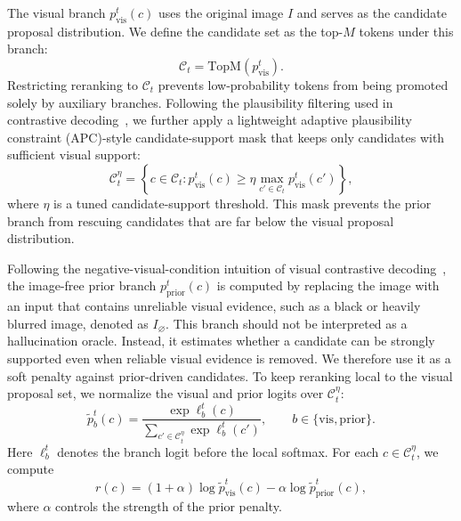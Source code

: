 \documentclass[11pt]{article}
\begin{document}
  The visual branch $p_{\mathrm{vis}}^t(c)$ uses the original image $I$ and serves as the candidate proposal distribution. We define the candidate set as the top-$M$ tokens under this branch:
  \begin{equation}
  \mathcal{C}_t = \mathrm{TopM}\left(p_{\mathrm{vis}}^t\right).
  \end{equation}
  Restricting reranking to $\mathcal{C}_t$ prevents low-probability tokens from being promoted solely by auxiliary branches.
  Following the plausibility filtering used in contrastive decoding~\citep{Leng_2024_CVPR}, we further apply a lightweight adaptive plausibility constraint (APC)-style candidate-support mask that keeps only candidates with sufficient visual support:
  \begin{equation}
  \mathcal{C}_t^{\eta} =
  \left\{
  c \in \mathcal{C}_t :
  p_{\mathrm{vis}}^t(c) \ge
  \eta \max_{c' \in \mathcal{C}_t} p_{\mathrm{vis}}^t(c')
  \right\},
  \end{equation}
  where $\eta$ is a tuned candidate-support threshold.
  This mask prevents the prior branch from rescuing candidates that are far below the visual proposal distribution.

  Following the negative-visual-condition intuition of visual contrastive decoding~\citep{Leng_2024_CVPR}, the image-free prior branch $p_{\mathrm{prior}}^t(c)$ is computed by replacing the image with an input that contains unreliable visual evidence, such as a black or heavily blurred image, denoted as
  $I_{\varnothing}$. This branch should not be interpreted as a hallucination oracle. Instead, it estimates whether a candidate can be strongly supported even when reliable visual evidence is removed. We therefore use
  it as a soft penalty against prior-driven candidates.
  To keep reranking local to the visual proposal set, we normalize the visual and prior logits over $\mathcal{C}_t^{\eta}$:
  \begin{equation}
  \tilde{p}_{b}^{t}(c) =
  \frac{\exp \ell_{b}^{t}(c)}
  {\sum_{c' \in \mathcal{C}_t^{\eta}} \exp \ell_{b}^{t}(c')},
  \qquad
  b \in \{\mathrm{vis}, \mathrm{prior}\}.
  \end{equation}
  Here $\ell_b^t$ denotes the branch logit before the local softmax.
  For each $c \in \mathcal{C}_t^{\eta}$, we compute
  \begin{equation}
  r(c) =
  (1+\alpha)\log \tilde{p}_{\mathrm{vis}}^t(c)
  -
  \alpha \log \tilde{p}_{\mathrm{prior}}^t(c),
  \end{equation}
  where $\alpha$ controls the strength of the prior penalty.
\end{document}
